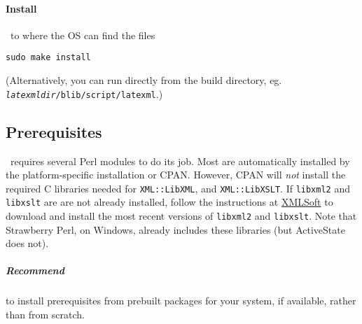 \documentclass{article}
\begin{document}
\paragraph*{Install} \LaTeXML\ to where the OS can find the files
\begin{lstlisting}[style=shell]
sudo make install
\end{lstlisting}
(Alternatively, you can run directly from the build directory, eg.
\texttt{\textit{latexmldir}/blib/script/latexml}.)

\subsection{Prerequisites}\label{get.prerequisites}
\LaTeXML\ requires several Perl modules to do its job.  Most
are automatically installed by the platform-specific installation or CPAN.
However, CPAN will \emph{not} install the required C libraries needed for
\texttt{XML::LibXML}, and \texttt{XML::LibXSLT}.
If \texttt{libxml2} and \texttt{libxslt} are are not already installed,
follow the instructions at \href{http://www.xmlsoft.org}{XMLSoft} to
download and install the most recent versions of \texttt{libxml2} and \texttt{libxslt}.
Note that Strawberry Perl, on Windows, already includes these libraries
(but ActiveState does not).

\subparagraph{Recommend} to install prerequisites from prebuilt packages
for your system, if available, rather than from scratch.
\end{document}
